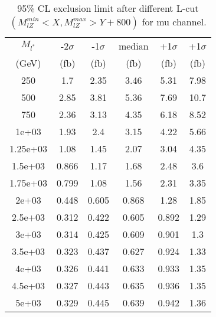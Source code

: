 \documentclass[]{article}
\begin{document}
\begin{table}
\begin{center}
\begin{tabular}{cccccc}
\hline 
\hline 
$M_{l^*}$ & -2$\sigma$ & -1$\sigma$ & median & +1$\sigma$ & +1$\sigma$\\ 
(GeV) & (fb) & (fb) & (fb) & (fb) & (fb)  \\ 
\hline 
\hline 
250 & 1.7 & 2.35 & 3.46 & 5.31 & 7.98\\
500 & 2.85 & 3.81 & 5.36 & 7.69 & 10.7\\
750 & 2.36 & 3.13 & 4.35 & 6.18 & 8.52\\
1e+03 & 1.93 & 2.4 & 3.15 & 4.22 & 5.66\\
1.25e+03 & 1.08 & 1.45 & 2.07 & 3.04 & 4.35\\
1.5e+03 & 0.866 & 1.17 & 1.68 & 2.48 & 3.6\\
1.75e+03 & 0.799 & 1.08 & 1.56 & 2.31 & 3.35\\
2e+03 & 0.448 & 0.605 & 0.868 & 1.28 & 1.85\\
2.5e+03 & 0.312 & 0.422 & 0.605 & 0.892 & 1.29\\
3e+03 & 0.314 & 0.425 & 0.609 & 0.901 & 1.3\\
3.5e+03 & 0.323 & 0.437 & 0.627 & 0.924 & 1.33\\
4e+03 & 0.326 & 0.441 & 0.633 & 0.933 & 1.35\\
4.5e+03 & 0.327 & 0.443 & 0.635 & 0.936 & 1.35\\
5e+03 & 0.329 & 0.445 & 0.639 & 0.942 & 1.36\\
\hline 
\end{tabular}
\caption{95\% CL exclusion limit after different L-cut $(M_{lZ}^{min} < X, M_{lZ}^{max} > Y + 800)$ for mu channel.}
\label{tab:limit_muon}
\end{center}
\end{table}
\end{document}
